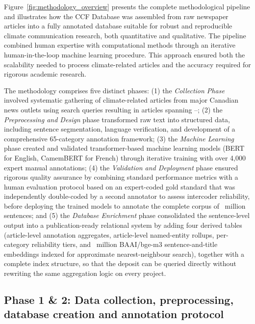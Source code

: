 \documentclass[12pt]{article}
\renewcommand\_{\texttt{\detokenize{_}\allowbreak}}
\begin{document}
Figure~\ref{fig:methodology_overview} presents the complete methodological pipeline and illustrates how the CCF Database was assembled from raw newspaper articles into a fully annotated database suitable for robust and reproducible climate communication research, both quantitative and qualitative. The pipeline combined human expertise with computational methods through an iterative human-in-the-loop machine learning procedure. This approach ensured both the scalability needed to process \CCFarticles{} climate-related articles and the accuracy required for rigorous academic research.

The methodology comprises five distinct phases: (1) the \emph{Collection Phase} involved systematic gathering of climate-related articles from \CCFnewspapers{} major Canadian news outlets using search queries resulting in \CCFarticles{} articles spanning \CCFyearfirst{}--\CCFyearlast{}; (2) the \emph{Preprocessing and Design} phase transformed raw text into structured data, including sentence segmentation, language verification, and development of a comprehensive 65-category annotation framework; (3) the \emph{Machine Learning} phase created and validated transformer-based machine learning models (BERT for English, CamemBERT for French) through iterative training with over 4,000 expert manual annotations; (4) the \emph{Validation and Deployment} phase ensured rigorous quality assurance by combining standard performance metrics with a human evaluation protocol based on an expert-coded gold standard that was independently double-coded by a second annotator to assess intercoder reliability, before deploying the trained models to annotate the complete corpus of \CCFsentApprox{}~million sentences; and (5) the \emph{Database Enrichment} phase consolidated the sentence-level output into a publication-ready relational system by adding four derived tables (article-level annotation aggregates, article-level named-entity rollups, per-category reliability tiers, and \CCFembedApprox{}~million BAAI/bge-m3 sentence-and-title embeddings indexed for approximate nearest-neighbour search), together with a complete index structure, so that the deposit can be queried directly without rewriting the same aggregation logic on every project.

\subsection{Phase 1 \& 2: Data collection, preprocessing, database creation and annotation protocol}
\end{document}
